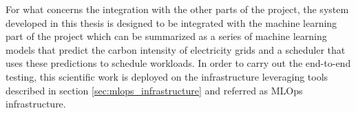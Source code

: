 For what concerns the integration with the other parts of the project, the system developed in this thesis is designed to be integrated with the machine learning part of the project which can be summarized as a series of machine learning models that predict the carbon intensity of electricity grids and a scheduler that uses these predictions to schedule workloads. 
In order to carry out the end-to-end testing, this scientific work is deployed on the infrastructure leveraging tools described in section \ref{sec:mlops_infrastructure} and referred as MLOps infrastructure.

\newpage
